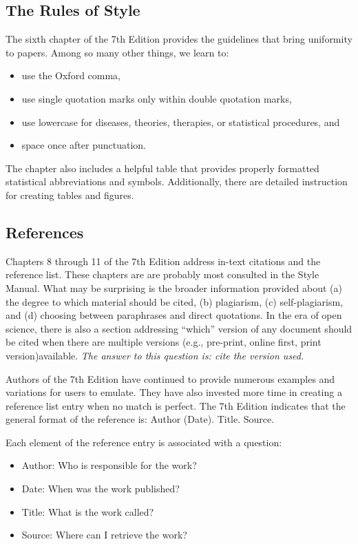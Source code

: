 \documentclass[
  11pt,
]{book}
\providecommand{\tightlist}{%
  \setlength{\itemsep}{0pt}\setlength{\parskip}{0pt}}
\begin{document}
\subsection{The Rules of Style}\label{the-rules-of-style}

The sixth chapter of the 7th Edition provides the guidelines that bring uniformity to papers. Among so many other things, we learn to:

\begin{itemize}
\tightlist
\item
  use the Oxford comma,
\item
  use single quotation marks only within double quotation marks,
\item
  use lowercase for diseases, theories, therapies, or statistical procedures, and
\item
  space once after punctuation.
\end{itemize}

The chapter also includes a helpful table that provides properly formatted statistical abbreviations and symbols. Additionally, there are detailed instruction for creating tables and figures.

\subsection{References}\label{references-1}

Chapters 8 through 11 of the 7th Edition address in-text citations and the reference list. These chapters are are probably most consulted in the Style Manual. What may be surprising is the broader information provided about (a) the degree to which material should be cited, (b) plagiarism, (c) self-plagiarism, and (d) choosing between paraphrases and direct quotations. In the era of open science, there is also a section addressing ``which'' version of any document should be cited when there are multiple versions (e.g., pre-print, online first, print version)available. \emph{The answer to this question is: cite the version used.}

Authors of the 7th Edition have continued to provide numerous examples and variations for users to emulate. They have also invested more time in creating a reference list entry when no match is perfect. The 7th Edition indicates that the general format of the reference is: Author (Date). Title. Source.

Each element of the reference entry is associated with a question:

\begin{itemize}
\tightlist
\item
  Author: Who is responsible for the work?
\item
  Date: When was the work published?
\item
  Title: What is the work called?
\item
  Source: Where can I retrieve the work?
\end{itemize}
\end{document}
